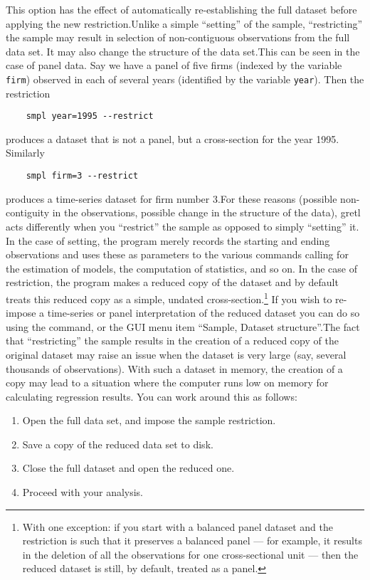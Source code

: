 This option has the effect of automatically re-establishing the full
dataset before applying the new restriction.Unlike a simple
``setting'' of the sample, ``restricting'' the sample may result in
selection of non-contiguous observations from the full data set.  It
may also change the structure of the data set.This can be seen in the
case of panel data.  Say we have a panel of five firms (indexed by the
variable \verb+firm+) observed in each of several years (identified by
the variable \verb+year+).  Then the restriction
%
\begin{verbatim}
	smpl year=1995 --restrict
\end{verbatim}
%
produces a dataset that is not a panel, but a cross-section for the
year 1995.  Similarly
%
\begin{verbatim}
	smpl firm=3 --restrict
\end{verbatim}
%
produces a time-series dataset for firm number 3.For these reasons
(possible non-contiguity in the observations, possible change in the
structure of the data), gretl acts differently when you ``restrict''
the sample as opposed to simply ``setting'' it. In the case of
setting, the program merely records the starting and ending
observations and uses these as parameters to the various commands
calling for the estimation of models, the computation of statistics,
and so on. In the case of restriction, the program makes a reduced
copy of the dataset and by default treats this reduced copy as a
simple, undated cross-section.\footnote{With one exception: if you
  start with a balanced panel dataset and the restriction is such that
  it preserves a balanced panel --- for example, it results in the
  deletion of all the observations for one cross-sectional unit ---
  then the reduced dataset is still, by default, treated as a panel.}
If you wish to re-impose a time-series or panel interpretation of the
reduced dataset you can do so using the  command, or the
GUI menu item ``Sample, Dataset structure''.The fact that
``restricting'' the sample results in the creation of a reduced copy
of the original dataset may raise an issue when the dataset is very
large (say, several thousands of observations).  With such a dataset
in memory, the creation of a copy may lead to a situation where the
computer runs low on memory for calculating regression results.  You
can work around this as follows:

\begin{enumerate}
\item Open the full data set, and impose the sample restriction.
\item Save a copy of the reduced data set to disk.
\item Close the full dataset and open the reduced one.
\item Proceed with your analysis.
\end{enumerate}

